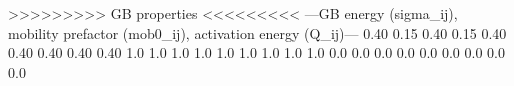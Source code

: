 >>>>>>>>> GB properties <<<<<<<<<
---GB energy (sigma_ij), mobility prefactor (mob0_ij), activation energy (Q_ij)---
0.40 0.15 0.40
0.15 0.40 0.40
0.40 0.40 0.40
1.0 1.0 1.0
1.0 1.0 1.0
1.0 1.0 1.0
0.0 0.0 0.0
0.0 0.0 0.0
0.0 0.0 0.0

